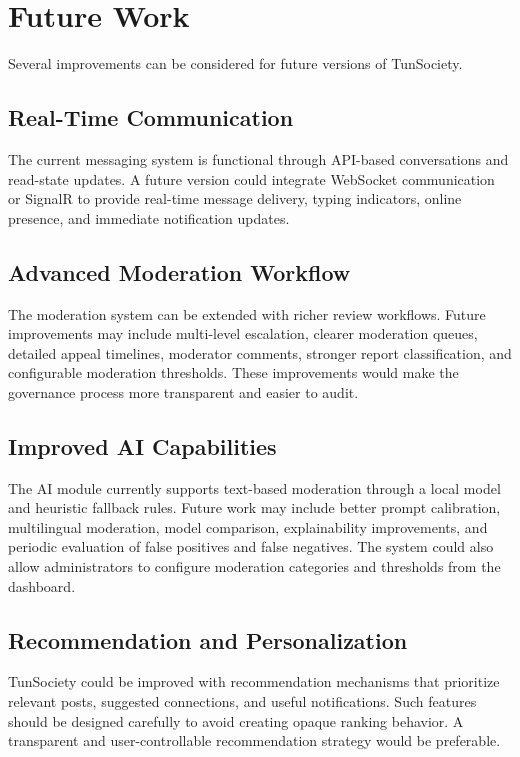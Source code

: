 \section{Future Work}

Several improvements can be considered for future versions of TunSociety.

\subsection{Real-Time Communication}

The current messaging system is functional through API-based conversations and read-state updates. A future version could integrate WebSocket communication or SignalR to provide real-time message delivery, typing indicators, online presence, and immediate notification updates.

\subsection{Advanced Moderation Workflow}

The moderation system can be extended with richer review workflows. Future improvements may include multi-level escalation, clearer moderation queues, detailed appeal timelines, moderator comments, stronger report classification, and configurable moderation thresholds. These improvements would make the governance process more transparent and easier to audit.

\subsection{Improved AI Capabilities}

The AI module currently supports text-based moderation through a local model and heuristic fallback rules. Future work may include better prompt calibration, multilingual moderation, model comparison, explainability improvements, and periodic evaluation of false positives and false negatives. The system could also allow administrators to configure moderation categories and thresholds from the dashboard.

\subsection{Recommendation and Personalization}

TunSociety could be improved with recommendation mechanisms that prioritize relevant posts, suggested connections, and useful notifications. Such features should be designed carefully to avoid creating opaque ranking behavior. A transparent and user-controllable recommendation strategy would be preferable.

